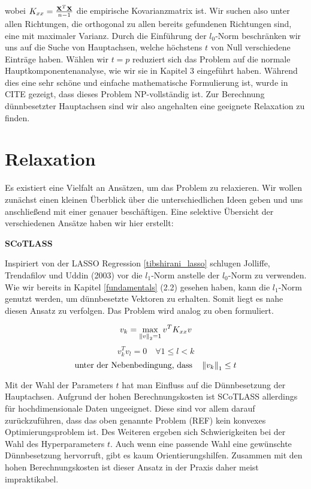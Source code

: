 wobei $K_{xx} = \frac{\mathbf{X}^T \mathbf{X}}{n-1}$ die empirische Kovarianzmatrix ist. Wir suchen also unter allen Richtungen, die orthogonal zu allen bereits gefundenen Richtungen sind, eine mit maximaler Varianz. Durch die Einführung der $l_0$-Norm beschränken wir uns auf die Suche von Hauptachsen, welche höchstens $t$ von Null verschiedene Einträge haben. Wählen wir $t = p$ reduziert sich das Problem auf die normale Hauptkomponentenanalyse, wie wir sie in Kapitel 3 eingeführt haben. Während dies eine sehr schöne und einfache mathematische Formulierung ist, wurde in CITE gezeigt, dass dieses Problem NP-vollständig ist. Zur Berechnung dünnbesetzter Hauptachsen sind wir also angehalten eine geeignete Relaxation zu finden.

\section{Relaxation} \label{relaxation}

Es existiert eine Vielfalt an Ansätzen, um das Problem zu relaxieren. Wir wollen zunächst einen kleinen Überblick über die unterschiedlichen Ideen geben und uns anschließend mit einer genauer beschäftigen. Eine selektive Übersicht der verschiedenen Ansätze haben wir hier erstellt:

\textbf{SCoTLASS}

Inspiriert von der LASSO Regression \ref{tibshirani_lasso} schlugen Jolliffe, Trendafilov und Uddin (2003) \cite{scotlass} vor die $l_1$-Norm anstelle der $l_0$-Norm zu verwenden. Wie wir bereits in Kapitel \ref{fundamentals} (2.2) gesehen haben, kann die $l_1$-Norm genutzt werden, um dünnbesetzte Vektoren zu erhalten. Somit liegt es nahe diesen Ansatz zu verfolgen. Das Problem wird analog zu oben formuliert.

$$v_{k} = \max_{\left\lVert v \right\rVert_2 = 1} v^{T}K_{xx} v$$
$$v_{k}^Tv_{l} = 0 \quad \forall 1 \leq l < k$$
$${\text{unter der Nebenbedingung, dass}}\quad \left\lVert v_{k} \right\rVert_1 \leq t$$

Mit der Wahl der Parameters $t$ hat man Einfluss auf die Dünnbesetzung der Hauptachsen. Aufgrund der hohen Berechnungskosten ist SCoTLASS allerdings für hochdimensionale Daten ungeeignet. Diese sind vor allem darauf zurückzuführen, dass das oben genannte Problem (REF) kein konvexes Optimierungsproblem ist. Des Weiteren ergeben sich Schwierigkeiten bei der Wahl des Hyperparameters $t$. Auch wenn eine passende Wahl eine gewünschte Dünnbesetzung hervorruft, gibt es kaum Orientierungshilfen. Zusammen mit den hohen Berechnungskosten ist dieser Ansatz in der Praxis daher meist impraktikabel.

